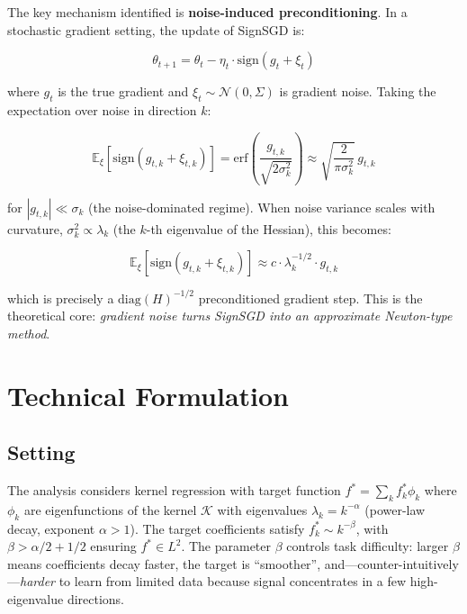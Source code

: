 \documentclass[10pt,twocolumn]{article}
\begin{document}
The key mechanism identified is \textbf{noise-induced preconditioning}.
In a stochastic gradient setting, the update of SignSGD is:

\begin{equation}
\theta_{t+1} = \theta_t - \eta_t \cdot \mathrm{sign}(g_t + \xi_t)
\end{equation}

where $g_t$ is the true gradient and $\xi_t \sim \mathcal{N}(0, \Sigma)$ is gradient noise.
Taking the expectation over noise in direction $k$:

\begin{equation}
\mathbb{E}_\xi[\mathrm{sign}(g_{t,k} + \xi_{t,k})] = \mathrm{erf}\!\left(\frac{g_{t,k}}{\sqrt{2\sigma^2_k}}\right) \approx \sqrt{\frac{2}{\pi\sigma^2_k}}\, g_{t,k}
\end{equation}

for $|g_{t,k}| \ll \sigma_k$ (the noise-dominated regime).
When noise variance scales with curvature, $\sigma^2_k \propto \lambda_k$ (the $k$-th eigenvalue of the Hessian), this becomes:

\begin{equation}
\mathbb{E}_\xi[\mathrm{sign}(g_{t,k} + \xi_{t,k})] \approx c \cdot \lambda_k^{-1/2} \cdot g_{t,k}
\label{eq:precond}
\end{equation}

which is precisely a $\mathrm{diag}(H)^{-1/2}$ preconditioned gradient step.
This is the theoretical core: \emph{gradient noise turns SignSGD into an approximate Newton-type method}.

\section{Technical Formulation}

\subsection*{Setting}

The analysis considers kernel regression with target function $f^* = \sum_k f^*_k \phi_k$ where $\phi_k$ are eigenfunctions of the kernel $\mathcal{K}$ with eigenvalues $\lambda_k = k^{-\alpha}$ (power-law decay, exponent $\alpha > 1$).
The target coefficients satisfy $f^*_k \sim k^{-\beta}$, with $\beta > \alpha/2 + 1/2$ ensuring $f^* \in L^2$.
The parameter $\beta$ controls task difficulty: larger $\beta$ means coefficients decay faster, the target is ``smoother'', and---counter-intuitively---\emph{harder} to learn from limited data because signal concentrates in a few high-eigenvalue directions.
\end{document}
